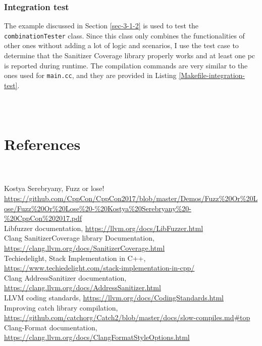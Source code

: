 \documentclass{elteikthesis}[2018/06/06]
\newcommand*{\code}{\lstinline[keywordstyle=\color{violet}, basicstyle=\color{violet}]}
\begin{document}
\subsection{Integration test}
\label{sec-3-3-3}
The example discussed in Section \ref{sec-3-1-2} is used to test the \code{combinationTester} class. Since this class only combines the functionalities of other ones without adding a lot of logic and scenarios, I use the test case to determine that the Sanitizer Coverage library properly works and at least one pc is reported during runtime. The compilation commands are very similar to the ones used for \code{main.cc}, and they are provided in Listing \ref{Makefile-integration-test}. \\

\begin{listing}
\caption{\label{Makefile-integration-test}Compiling the integration test \code{Makefile}}
\inputminted[firstline=97,lastline=118,breaklines]{bash}{Makefile} \\
\end{listing}

\chapter*{References} \\
\setcounter{page}{43} \\
\footnotemark[1]{} Kostya Serebryany, Fuzz or lose! \url{https://github.com/CppCon/CppCon2017/blob/master/Demos/Fuzz\%20Or\%20Lose/Fuzz\%20Or\%20Lose\%20-\%20Kostya\%20Serebryany\%20-\%20CppCon\%202017.pdf} \\

\footnotemark[2]{} Libfuzzer documentation, \url{https://llvm.org/docs/LibFuzzer.html} \\

\footnotemark[3]{} Clang SanitizerCoverage library Documentation, \url{https://clang.llvm.org/docs/SanitizerCoverage.html} \\

\footnotemark[4]{} Techiedelight, Stack Implementation in C++, \url{https://www.techiedelight.com/stack-implementation-in-cpp/} \\

\footnotemark[5]{} Clang AddressSanitizer documentation, \url{https://clang.llvm.org/docs/AddressSanitizer.html} \\

\footnotemark[6]{} LLVM coding standards, \url{https://llvm.org/docs/CodingStandards.html} \\

\footnotemark[8]{} Improving catch library compilation, \url{https://github.com/catchorg/Catch2/blob/master/docs/slow-compiles.md#top} \\

\footnotemark[7]{} Clang-Format documentation, \url{https://clang.llvm.org/docs/ClangFormatStyleOptions.html} \\
\end{document}
